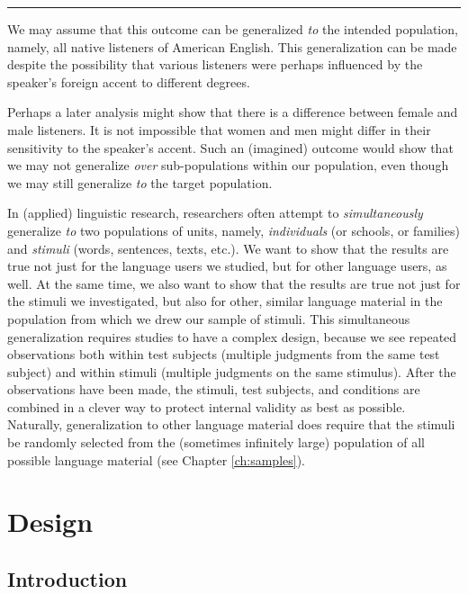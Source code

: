 \documentclass[
]{book}
\begin{document}
\begin{center}\rule{0.5\linewidth}{0.5pt}\end{center}

We may assume that this outcome can be generalized \emph{to} the intended population, namely, all native listeners of American English. This generalization can be made despite the possibility that various listeners were perhaps influenced by the speaker's foreign accent to different degrees.

Perhaps a later analysis might show that there is a difference between female and male listeners. It is not impossible that women and men might differ in their sensitivity to the speaker's accent. Such an (imagined) outcome would show that we may not generalize \emph{over} sub-populations within our population, even though we may still generalize \emph{to} the target population.

In (applied) linguistic research, researchers often attempt to \emph{simultaneously} generalize \emph{to} two populations of units, namely, \emph{individuals} (or schools, or families) and \emph{stimuli} (words, sentences, texts, etc.). We want to show that the results are true not just for the language users we studied, but for other language users, as well. At the same time, we also want to show that the results are true not just for the stimuli we investigated, but also for other, similar language material in the population from which we drew our sample of stimuli. This simultaneous generalization requires studies to have a complex design, because we see repeated observations both within test subjects (multiple judgments from the same test subject) and within stimuli (multiple judgments on the same stimulus). After the observations have been made, the stimuli, test subjects, and conditions are combined in a clever way to protect internal validity as best as possible. Naturally, generalization to other language material does require that the stimuli be randomly selected from the (sometimes infinitely large) population of all possible language material (see Chapter \ref{ch:samples}).

\hypertarget{ch:design}{%
\chapter{Design}\label{ch:design}}

\hypertarget{sec:design-introduction}{%
\section{Introduction}\label{sec:design-introduction}}
\end{document}
